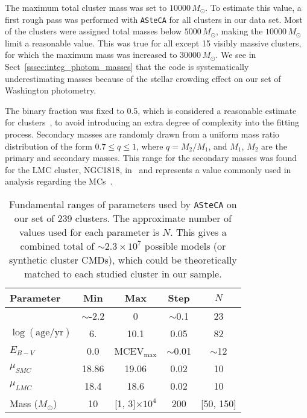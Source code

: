 \documentclass[draft]{aa}
\begin{document}
The maximum total cluster mass was set to $10000\,M_{\odot}$.
%
To estimate this value, a first rough pass was performed with
\texttt{ASteCA} for all clusters in our data set. Most of the clusters were assigned
total masses below $5000\,M_{\odot}$, making the $10000\,M_{\odot}$ limit a
reasonable value.
%
This was true for all except 15 visibly massive clusters, for which the
maximum mass was increased to $30000\,M_{\odot}$. We see
in Sect~\ref{sssec:integ_photom_masses} that the code is systematically
underestimating masses because of the stellar crowding effect on our set of
Washington photometry.

The binary fraction was fixed to 0.5, which is considered a
reasonable estimate for clusters~\citep{von_Hippel_2005,Sollima_2010}, to
avoid introducing an extra degree of complexity into the fitting process.
Secondary masses are randomly drawn from a uniform mass ratio distribution of
the form $0.7{\le}q{\le}1$, where $q{=}M_2/M_1$, and $M_1$, $M_2$ are the
primary and secondary masses. This range for the secondary masses was found for
the LMC cluster, NGC1818, in~\cite{Elson_1998} and represents a value
commonly used in analysis regarding the MCs~\citep[see][and references therein]
{Rubele_2011}.

\begin{table}
\centering
\caption{Fundamental ranges of parameters used by \texttt{ASteCA} on our set
of 239 clusters. The approximate number of values used for each parameter is
$N$. This gives a combined total of ${\sim}2.3 {\times}10^7$ possible models 
(or synthetic cluster CMDs), which could be theoretically matched to each studied
cluster in our sample.}
\label{tab:ga-range}
\begin{tabular}{lcccc}
\hline\hline
 Parameter & Min & Max & Step & $N$\\
\hline
[Fe/H] & $\sim$-2.2 & 0 & $\sim$0.1 & 23\\
$\log\mathrm{(age/yr)}$ & 6. & 10.1 & 0.05 & 82\\
$E_{B-V}$ & 0.0 & MCEV$_{\max}$ & ${\sim}$0.01 & $\sim$12\\
$\mu_{SMC}$ & 18.86 & 19.06 & 0.02 & 10\\
$\mu_{LMC}$ & 18.4 & 18.6 & 0.02 & 10\\
Mass ($M_{\odot}$) & 10 & [1, 3]${\times}10^{4}$ & 200 & [50, 150]\\
\hline
\end{tabular}
\end{table}
\end{document}
